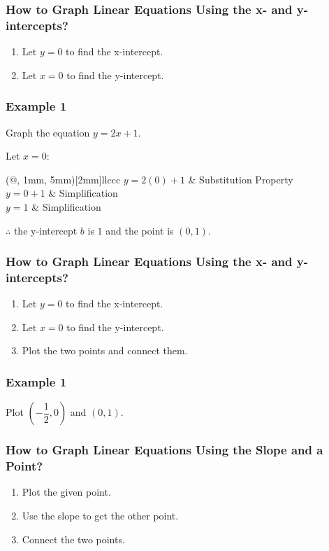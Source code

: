 \documentclass[14pt]{beamer}
\begin{document}
   \begin{frame}
   	\frametitle{How to Graph Linear Equations Using the x- and y-intercepts?}
   	\begin{enumerate}  
   		\item Let $ y = 0 $ to find the x-intercept.
   		\item Let $ x = 0 $ to find the y-intercept.
   	\end{enumerate} 
   \end{frame} 
   
   \begin{frame}
   	\frametitle{Example 1}
   	Graph the equation $ y = 2x + 1 $.
   	
   	\vone Let $ x = 0: $
   	
   	\vhalf
   	
   	\begin{TAB}(@, 1mm, 5mm)[2mm]{ll}{ccc}
   		\pause $ y = 2(0) + 1 $ & \pause Substitution Property \\
   		
   		\pause $ y = 0 + 1 $ & \pause Simplification\\
   		
   		\pause  $ y = 1 $ & Simplification \\
   	\end{TAB}
   	
   	\pause $ \therefore $ the y-intercept $ b $ is $ 1 $ and the point is $ (0, 1) $.
   \end{frame}
   
   
   \begin{frame}
   	\frametitle{How to Graph Linear Equations Using the x- and y-intercepts?}
   	\begin{enumerate}  
   		\item Let $ y = 0 $ to find the x-intercept.
   		\item Let $ x = 0 $ to find the y-intercept.
   		\item Plot the two points and connect them.
   	\end{enumerate} 
   \end{frame} 
   
   \begin{frame}
   	\frametitle{Example 1}
   	Plot $ \left(-\dfrac{1}{2}, 0 \right) $ and $ (0, 1) $.
   \end{frame}

    \begin{frame}
    	\frametitle{How to Graph Linear Equations Using the Slope and a Point?}
    	\begin{enumerate}  
    		\item Plot the given point.
    		\item \pause Use the slope to get the other point.
    		\item \pause Connect the two points.
    	\end{enumerate} 
    \end{frame} 
\end{document}
